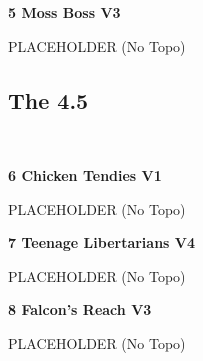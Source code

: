 \begin{multicols}{2}
					\begin{minipage}{\linewidth}	
					\label{rt:Moss Boss}
\colorbox{green!20}{
\parbox{0.95\textwidth}{
\textbf{
5 Moss Boss V3   
}
}
}

					\begin{adjustwidth}{0.5cm}{}				
					PLACEHOLDER
						\newline (No Topo) 
					\end{adjustwidth}
					\end{minipage}
			\begin{minipage}{\columnwidth}
			\subsection*{The 4.5}\label{bf:The 4.5}
			\
			
			\end{minipage}
			
					\begin{minipage}{\linewidth}	
					\label{rt:Chicken Tendies}
\colorbox{green!20}{
\parbox{0.95\textwidth}{
\textbf{
6 Chicken Tendies V1   
}
}
}

					\begin{adjustwidth}{0.5cm}{}				
					PLACEHOLDER
						\newline (No Topo) 
					\end{adjustwidth}
					\end{minipage}
					\begin{minipage}{\linewidth}	
					\label{rt:Teenage Libertarians}
\colorbox{RoyalBlue!20}{
\parbox{0.95\textwidth}{
\textbf{
7 Teenage Libertarians V4     
}
}
}

					\begin{adjustwidth}{0.5cm}{}				
					PLACEHOLDER
						\newline (No Topo) 
					\end{adjustwidth}
					\end{minipage}
					\begin{minipage}{\linewidth}	
					\label{rt:Falcon's Reach}
\colorbox{green!20}{
\parbox{0.95\textwidth}{
\textbf{
8 Falcon's Reach V3   
}
}
}

					\begin{adjustwidth}{0.5cm}{}				
					PLACEHOLDER
						\newline (No Topo) 
					\end{adjustwidth}
					\end{minipage}
\newpage

\end{multicols}
